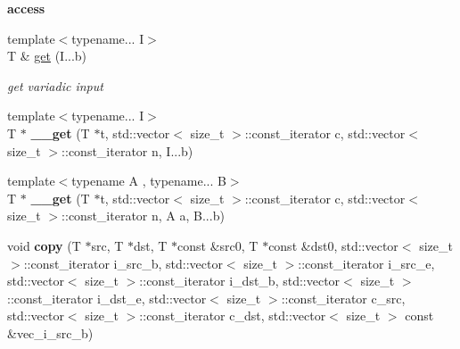 \begin{Indent}{\bf access}
\begin{DoxyCompactItemize}
\item 
\hypertarget{class____array_a7fb64a0fa23884f3178a913ab3a09f58}{
{\footnotesize template$<$typename... I$>$ }\\T \& \hyperlink{class____array_a7fb64a0fa23884f3178a913ab3a09f58}{get} (I...b)}
\label{class____array_a7fb64a0fa23884f3178a913ab3a09f58}

\begin{DoxyCompactList}\small\item\em get variadic input \item\end{DoxyCompactList}\item 
\hypertarget{class____array_ab0af5463ffa3d721d81e3938d7a5c3ed}{
{\footnotesize template$<$typename... I$>$ }\\T $\ast$ {\bfseries \_\-\_\-get} (T $\ast$t, std::vector$<$ size\_\-t $>$::const\_\-iterator c, std::vector$<$ size\_\-t $>$::const\_\-iterator n, I...b)}
\label{class____array_ab0af5463ffa3d721d81e3938d7a5c3ed}

\item 
\hypertarget{class____array_aeffcb69960a45effe25b65fa54403d19}{
{\footnotesize template$<$typename A , typename... B$>$ }\\T $\ast$ {\bfseries \_\-\_\-get} (T $\ast$t, std::vector$<$ size\_\-t $>$::const\_\-iterator c, std::vector$<$ size\_\-t $>$::const\_\-iterator n, A a, B...b)}
\label{class____array_aeffcb69960a45effe25b65fa54403d19}

\item 
\hypertarget{class____array_a64d5066190f4f4016e60ac4acf836ed2}{
void {\bfseries copy} (T $\ast$src, T $\ast$dst, T $\ast$const \&src0, T $\ast$const \&dst0, std::vector$<$ size\_\-t $>$::const\_\-iterator i\_\-src\_\-b, std::vector$<$ size\_\-t $>$::const\_\-iterator i\_\-src\_\-e, std::vector$<$ size\_\-t $>$::const\_\-iterator i\_\-dst\_\-b, std::vector$<$ size\_\-t $>$::const\_\-iterator i\_\-dst\_\-e, std::vector$<$ size\_\-t $>$::const\_\-iterator c\_\-src, std::vector$<$ size\_\-t $>$::const\_\-iterator c\_\-dst, std::vector$<$ size\_\-t $>$ const \&vec\_\-i\_\-src\_\-b)}
\label{class____array_a64d5066190f4f4016e60ac4acf836ed2}

\end{DoxyCompactItemize}
\end{Indent}
